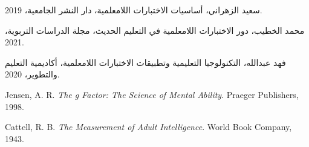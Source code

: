 \documentclass{arabicClass}
\begin{document}
	
	
	
\tableofcontents
\clearpage
{}


	
	
	
	
	
	
	\begin{thebibliography}{99}
		
سعيد الزهراني،
		أساسيات الاختبارات اللامعلمية، دار النشر الجامعية، 2019.
		
		محمد الخطيب، دور الاختبارات اللامعلمية في التعليم الحديث، مجلة الدراسات التربوية، 2021.
		
		فهد عبدالله، التكنولوجيا التعليمية وتطبيقات الاختبارات اللامعلمية، أكاديمية التعليم والتطوير، 2020.
		
	\begin{english}
		Jensen, A. R. \textit{The g Factor: The Science of Mental Ability}. Praeger Publishers, 1998.
		
		Cattell, R. B. \textit{The Measurement of Adult Intelligence}. World Book Company, 1943.
	\end{english}
		
	\end{thebibliography}
	
   
\end{document}
